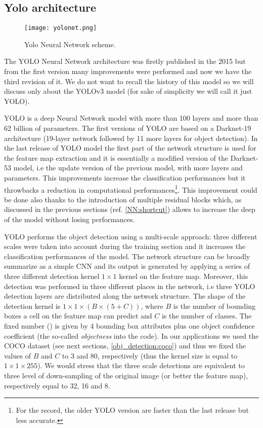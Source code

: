 \documentclass{standalone}
\begin{document}
\subsection[Yolo]{Yolo architecture}\label{obj_detection:yolo}

\begin{center}
\begin{figure}[htbp]
\centering
\texttt{[image: yolonet.png]}
\caption{Yolo Neural Network scheme.
}
\label{fig:yolo}
\end{figure}
\end{center}

The YOLO Neural Network architecture was firstly published in the 2015 but from the first version many improvements were performed and now we have the third revision of it.
We do not want to recall the history of this model so we will discuss only about the YOLOv3 model (for sake of simplicity we will call it just YOLO).

YOLO is a deep Neural Network model with more than 100 layers and more than 62 billion of parameters.
The first versions of YOLO are based on a Darknet-19 architecture (19-layer network followed by 11 more layers for object detection).
In the last release of YOLO model the first part of the network structure is used for the feature map extraction and it is essentially a modified version of the Darknet-53 model, i.e the update version of the previous model, with more layers and parameters.
This improvements increase the classification performances but it throwbacks a reduction in computational performances\footnote{
For the record, the older YOLO version are faster than the last release but less accurate.
}.
This improvement could be done also thanks to the introduction of multiple residual blocks which, as discussed in the previous sections (ref. \ref{NN:shortcut}) allows to increase the deep of the model without losing performances.

YOLO performs the object detection using a multi-scale approach: three different scales were taken into account during the training section and it increases the classification performances of the model.
The network structure can be broadly summarize as a simple CNN and its output is generated by applying a series of three different detection kernel $1\times1$ kernel on the feature map.
Moreover, this detection was performed in three different places in the network, i.e three YOLO detection layers are distributed along the network structure.
The shape of the detection kernel is $1\times1\times(B\times(5 + C))$, where $B$ is the number of bounding boxes a cell on the feature map can predict and $C$ is the number of classes.
The fixed number () is given by 4 bounding box attributes plus one object confidence coefficient (the so-called \emph{objectness} into the code).
In our applications we used the COCO dataset (see next sections, \ref{obj_detection:coco}) and thus we fixed the values of $B$ and $C$ to 3 and 80, respectively (thus the kernel size is equal to $1\times1\times255$).
We would stress that the three scale detections are equivalent to three level of down-sampling of the original image (or better the feature map), respectively equal to 32, 16 and 8.
\end{document}
